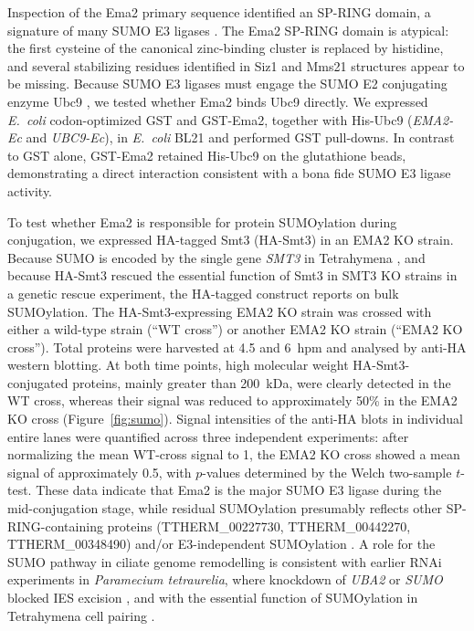 \documentclass[11pt]{article}
\begin{document}
Inspection of the Ema2 primary sequence identified an SP-RING domain, a
signature of many SUMO E3 ligases \citep{hochstrasser2001spring}. The
Ema2 SP-RING domain is atypical: the first cysteine of the canonical
zinc-binding cluster is replaced by histidine, and several stabilizing
residues identified in Siz1 and Mms21 structures
\citep{yunus2009siz1,duan2009mms21} appear to be missing. Because SUMO
E3 ligases must engage the SUMO E2 conjugating enzyme Ubc9
\citep{sampson2001sumo}, we tested whether Ema2 binds Ubc9 directly.
We expressed \emph{E.~coli} codon-optimized GST and GST-Ema2, together
with His-Ubc9 (\emph{EMA2-Ec} and \emph{UBC9-Ec}), in \emph{E.~coli} BL21
and performed GST pull-downs. In contrast to GST alone, GST-Ema2 retained
His-Ubc9 on the glutathione beads, demonstrating a direct interaction
consistent with a bona fide SUMO E3 ligase activity.

To test whether Ema2 is responsible for protein SUMOylation during
conjugation, we expressed HA-tagged Smt3 (HA-Smt3) in an EMA2 KO strain.
Because SUMO is encoded by the single gene \emph{SMT3} in Tetrahymena
\citep{nasir2015sumo}, and because HA-Smt3 rescued the essential function
of Smt3 in SMT3 KO strains in a genetic rescue experiment, the HA-tagged
construct reports on bulk SUMOylation. The HA-Smt3-expressing EMA2 KO
strain was crossed with either a wild-type strain (``WT cross'') or
another EMA2 KO strain (``EMA2 KO cross''). Total proteins were harvested
at 4.5 and 6~hpm and analysed by anti-HA western blotting. At both time
points, high molecular weight HA-Smt3-conjugated proteins, mainly greater
than 200~kDa, were clearly detected in the WT cross, whereas their signal
was reduced to approximately 50\% in the EMA2 KO cross
(Figure~\ref{fig:sumo}). Signal intensities of the anti-HA blots in
individual entire lanes were quantified across three independent
experiments: after normalizing the mean WT-cross signal to 1, the EMA2
KO cross showed a mean signal of approximately 0.5, with $p$-values
determined by the Welch two-sample $t$-test. These data indicate that Ema2 is the major SUMO E3
ligase during the mid-conjugation stage, while residual SUMOylation
presumably reflects other SP-RING-containing proteins
(TTHERM\_00227730, TTHERM\_00442270, TTHERM\_00348490) and/or
E3-independent SUMOylation \citep{sampson2001sumo}. A role for the SUMO
pathway in ciliate genome remodelling is consistent with earlier RNAi
experiments in \emph{Paramecium tetraurelia}, where knockdown of
\emph{UBA2} or \emph{SUMO} blocked IES excision \citep{matsuda2006sumo},
and with the essential function of SUMOylation in Tetrahymena cell
pairing \citep{nasir2015sumo}.
\end{document}
